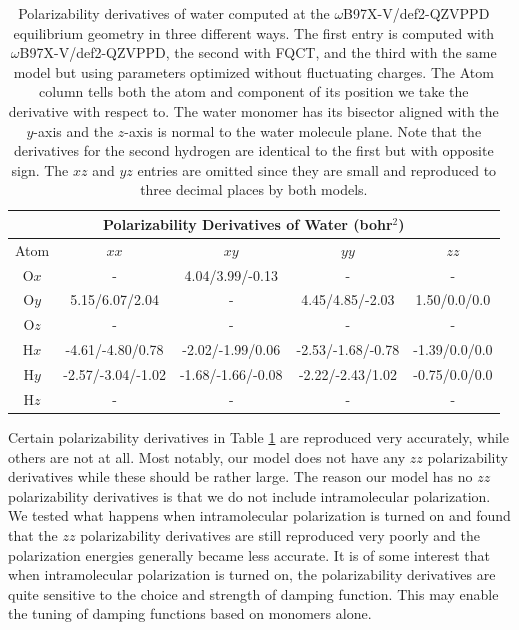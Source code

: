 \documentclass[journal=jctcce,manuscript=article]{achemso}
\begin{document}
\begin{table}[ht!]
  \begin{center}
  \begin{tabular}{ccccc}
      \multicolumn{5}{c}{Polarizability Derivatives of Water (bohr$^2$)} \\\hline
       Atom & $xx$ & $xy$ & $yy$ & $zz$ \\\hline
       O$x$ & -                 & 4.04/3.99/-0.13    & -                  & -  \\
       O$y$ & 5.15/6.07/2.04    & -                  & 4.45/4.85/-2.03    & 1.50/0.0/0.0  \\
       O$z$ & -                 & -                  & -                  & -  \\
       H$x$ & -4.61/-4.80/0.78  & -2.02/-1.99/0.06   & -2.53/-1.68/-0.78  & -1.39/0.0/0.0  \\
       H$y$ & -2.57/-3.04/-1.02 & -1.68/-1.66/-0.08  & -2.22/-2.43/1.02   & -0.75/0.0/0.0  \\
       H$z$ & -                 & -                  & -                  & -  \\\hline
  \end{tabular}
  \end{center}
  \vspace{-3mm}
  \caption{Polarizability derivatives of water computed at the $\omega$B97X-V/def2-QZVPPD equilibrium geometry in three different ways. The first entry is computed with $\omega$B97X-V/def2-QZVPPD, the second with FQCT, and the third with the same model but using parameters optimized without fluctuating charges. The Atom column tells both the atom and component of its position we take the derivative with respect to. The water monomer has its bisector aligned with the $y$-axis and the $z$-axis is normal to the water molecule plane. Note that the derivatives for the second hydrogen are identical to the first but with opposite sign. The $xz$ and $yz$ entries are omitted since they are small and reproduced to three decimal places by both models.}
  \label{tab:pol_derivs}
\end{table}

Certain polarizability derivatives in Table \ref{tab:pol_derivs} are reproduced very accurately, while others are not at all. Most notably, our model does not have any $zz$ polarizability derivatives while these should be rather large. The reason our model has no $zz$ polarizability derivatives is that we do not include intramolecular polarization. We tested what happens when intramolecular polarization is turned on and found that the $zz$ polarizability derivatives are still reproduced very poorly and the polarization energies generally became less accurate. It is of some interest that when intramolecular polarization is turned on, the polarizability derivatives are quite sensitive to the choice and strength of damping function. This may enable the tuning of damping functions based on monomers alone.
\end{document}
